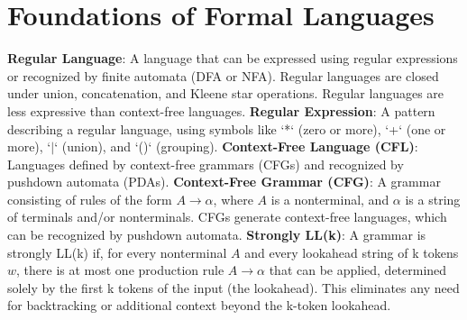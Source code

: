 \section{Foundations of Formal Languages}
\textbf{Regular Language}: A language that can be expressed using regular expressions or recognized by finite automata (DFA or NFA). Regular languages are closed under union, concatenation, and Kleene star operations.  Regular languages are less expressive than context-free languages.
\textbf{Regular Expression}: A pattern describing a regular language, using symbols like `*` (zero or more), `+` (one or more), `$\vert$` (union), and `()` (grouping).
\textbf{Context-Free Language (CFL)}: Languages defined by context-free grammars (CFGs) and recognized by pushdown automata (PDAs).
\textbf{Context-Free Grammar (CFG)}: A grammar consisting of rules of the form $A \rightarrow \alpha $, where $A$ is a nonterminal, and $\alpha $ is a string of terminals and/or nonterminals. CFGs generate context-free languages, which can be recognized by pushdown automata.
\textbf{Strongly LL(k)}: A grammar is strongly LL(k) if, for every nonterminal $ A $ and every lookahead string of k tokens $ w $, there is at most one production rule $ A \to \alpha $ that can be applied, determined solely by the first k tokens of the input (the lookahead). This eliminates any need for backtracking or additional context beyond the k-token lookahead.
